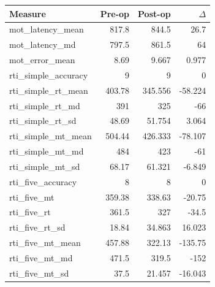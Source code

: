 \begin{longtable}{p{.47\linewidth}rrr}
\toprule Measure & Pre-op & Post-op & $\Delta$ \\
\midrule\endhead
{\ttfamily\footnotesize mot\_\allowbreak{}latency\_\allowbreak{}mean} & 817.8 & 844.5 & 26.7 \\
{\ttfamily\footnotesize mot\_\allowbreak{}latency\_\allowbreak{}md} & 797.5 & 861.5 & 64 \\
{\ttfamily\footnotesize mot\_\allowbreak{}error\_\allowbreak{}mean} & 8.69 & 9.667 & 0.977 \\
{\ttfamily\footnotesize rti\_\allowbreak{}simple\_\allowbreak{}accuracy} & 9 & 9 & 0 \\
{\ttfamily\footnotesize rti\_\allowbreak{}simple\_\allowbreak{}rt\_\allowbreak{}mean} & 403.78 & 345.556 & -58.224 \\
{\ttfamily\footnotesize rti\_\allowbreak{}simple\_\allowbreak{}rt\_\allowbreak{}md} & 391 & 325 & -66 \\
{\ttfamily\footnotesize rti\_\allowbreak{}simple\_\allowbreak{}rt\_\allowbreak{}sd} & 48.69 & 51.754 & 3.064 \\
{\ttfamily\footnotesize rti\_\allowbreak{}simple\_\allowbreak{}mt\_\allowbreak{}mean} & 504.44 & 426.333 & -78.107 \\
{\ttfamily\footnotesize rti\_\allowbreak{}simple\_\allowbreak{}mt\_\allowbreak{}md} & 484 & 423 & -61 \\
{\ttfamily\footnotesize rti\_\allowbreak{}simple\_\allowbreak{}mt\_\allowbreak{}sd} & 68.17 & 61.321 & -6.849 \\
{\ttfamily\footnotesize rti\_\allowbreak{}five\_\allowbreak{}accuracy} & 8 & 8 & 0 \\
{\ttfamily\footnotesize rti\_\allowbreak{}five\_\allowbreak{}mt} & 359.38 & 338.63 & -20.75 \\
{\ttfamily\footnotesize rti\_\allowbreak{}five\_\allowbreak{}rt} & 361.5 & 327 & -34.5 \\
{\ttfamily\footnotesize rti\_\allowbreak{}five\_\allowbreak{}rt\_\allowbreak{}sd} & 18.84 & 34.863 & 16.023 \\
{\ttfamily\footnotesize rti\_\allowbreak{}five\_\allowbreak{}mt\_\allowbreak{}mean} & 457.88 & 322.13 & -135.75 \\
{\ttfamily\footnotesize rti\_\allowbreak{}five\_\allowbreak{}mt\_\allowbreak{}md} & 471.5 & 319.5 & -152 \\
{\ttfamily\footnotesize rti\_\allowbreak{}five\_\allowbreak{}mt\_\allowbreak{}sd} & 37.5 & 21.457 & -16.043 \\

\end{longtable}
